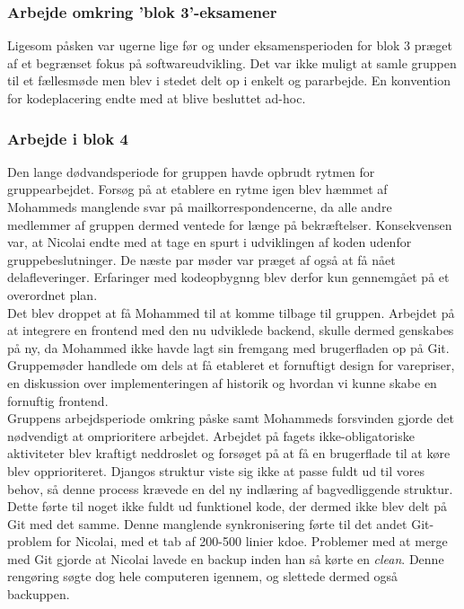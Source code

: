 \documentclass[]{article}
\begin{document}
\subsubsection{Arbejde omkring 'blok 3'-eksamener}
Ligesom påsken var ugerne lige før og under eksamensperioden for blok 3 præget af et begrænset fokus på softwareudvikling. Det var ikke muligt at samle gruppen til et fællesmøde men blev i stedet delt op i enkelt og pararbejde. En konvention for kodeplacering endte med at blive besluttet ad-hoc.

\subsubsection{Arbejde i blok 4}
Den lange dødvandsperiode for gruppen havde opbrudt rytmen for gruppearbejdet. Forsøg på at etablere en rytme igen blev hæmmet af Mohammeds manglende svar på mailkorrespondencerne, da alle andre medlemmer af gruppen dermed ventede for længe på bekræftelser. Konsekvensen var, at Nicolai endte med at tage en spurt i udviklingen af koden udenfor gruppebeslutninger. De næste par møder var præget af også at få nået delafleveringer. Erfaringer med kodeopbygnng blev derfor kun gennemgået på et overordnet plan. \\
\indent Det blev droppet at få Mohammed til at komme tilbage til gruppen. Arbejdet på at integrere en frontend med den nu udviklede backend, skulle dermed genskabes på ny, da Mohammed ikke havde lagt sin fremgang med brugerfladen op på Git. \\
\indent Gruppemøder handlede om dels at få etableret et fornuftigt design for varepriser, en diskussion over implementeringen af historik og hvordan vi kunne skabe en fornuftig frontend. \\
\indent Gruppens arbejdsperiode omkring påske samt Mohammeds forsvinden gjorde det nødvendigt at omprioritere arbejdet. Arbejdet på fagets ikke-obligatoriske aktiviteter blev kraftigt neddroslet og forsøget på at få en brugerflade til at køre blev opprioriteret. Djangos struktur viste sig ikke at passe fuldt ud til vores behov, så denne process krævede en del ny indlæring af bagvedliggende struktur. Dette førte til noget ikke fuldt ud funktionel kode, der dermed ikke blev delt på Git med det samme.
Denne manglende synkronisering førte til det andet Git-problem for Nicolai, med et tab af 200-500 linier kdoe. Problemer med at merge med Git gjorde at Nicolai lavede en backup inden han så kørte en \textit{clean}. Denne rengøring søgte dog hele computeren igennem, og slettede dermed også backuppen.
\pagebreak[3]
\end{document}
